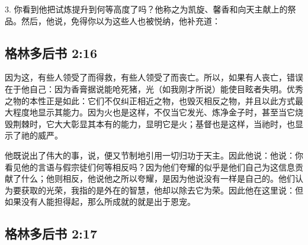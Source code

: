 3. 你看到他把试炼提升到何等高度了吗？他称之为凯旋、馨香和向天主献上的祭品。然后，他说，免得你以为这些人也被悦纳，他补充道：\par


\subsection{格林多后书 2:16}

\par

因为这，有些人领受了而得救，有些人领受了而丧亡。所以，如果有人丧亡，错误在于他自己：因为香膏据说能呛死猪，光（如我刚才所说）能使目眩者失明。优秀之物的本性正是如此：它们不仅纠正相近之物，也毁灭相反之物，并且以此方式最大程度地显示其能力。因为火也是这样，不仅当它发光、炼净金子时，甚至当它烧毁荆棘时，它大大彰显其本有的能力，显明它是火；基督也是这样，当祂时，也显示了祂的威严。\par

\par

他既说出了伟大的事，说，便又节制地引用一切归功于天主。因此他说：他说：你看见他的言语与假宗徒们何等相反吗？因为他们夸耀的似乎是他们自己为这信息贡献了什么；他则相反，他说他之所以夸耀，是因为他说没有一样是自己的。他们认为要获取的光荣，我指的是外在的智慧，他却以除去它为荣。因此他在这里说：但如果没有人能担得起，那么所成就的就是出于恩宠。\par


\subsection{格林多后书 2:17}

\par

